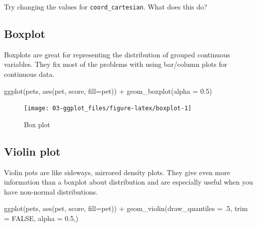 \documentclass[
  oneside]{book}
\newenvironment{Shaded}{\begin{snugshade}}{\end{snugshade}}
\newcommand{\AttributeTok}[1]{\textcolor[rgb]{0.77,0.63,0.00}{#1}}
\newcommand{\ConstantTok}[1]{\textcolor[rgb]{0.00,0.00,0.00}{#1}}
\newcommand{\DecValTok}[1]{\textcolor[rgb]{0.00,0.00,0.81}{#1}}
\newcommand{\FloatTok}[1]{\textcolor[rgb]{0.00,0.00,0.81}{#1}}
\newcommand{\FunctionTok}[1]{\textcolor[rgb]{0.00,0.00,0.00}{#1}}
\newcommand{\NormalTok}[1]{#1}
\newcommand{\SpecialCharTok}[1]{\textcolor[rgb]{0.00,0.00,0.00}{#1}}
\begin{document}
\begin{try}
Try changing the values for \texttt{coord\_cartesian}. What does this do?

\end{try}

\hypertarget{geom_boxplot}{%
\subsection{Boxplot}\label{geom_boxplot}}

Boxplots are great for representing the distribution of grouped continuous variables. They fix most of the problems with using bar/column plots for continuous data.

\begin{Shaded}
\begin{Highlighting}[]
\FunctionTok{ggplot}\NormalTok{(pets, }\FunctionTok{aes}\NormalTok{(pet, score, }\AttributeTok{fill=}\NormalTok{pet)) }\SpecialCharTok{+}
  \FunctionTok{geom\_boxplot}\NormalTok{(}\AttributeTok{alpha =} \FloatTok{0.5}\NormalTok{)}
\end{Highlighting}
\end{Shaded}

\begin{figure}

{\centering \texttt{[image: 03-ggplot\_files/figure-latex/boxplot-1]} 

}

\caption{Box plot}\label{fig:boxplot}
\end{figure}

\hypertarget{geom_violin}{%
\subsection{Violin plot}\label{geom_violin}}

Violin pots are like sideways, mirrored density plots. They give even more information than a boxplot about distribution and are especially useful when you have non-normal distributions.

\begin{Shaded}
\begin{Highlighting}[]
\FunctionTok{ggplot}\NormalTok{(pets, }\FunctionTok{aes}\NormalTok{(pet, score, }\AttributeTok{fill=}\NormalTok{pet)) }\SpecialCharTok{+}
  \FunctionTok{geom\_violin}\NormalTok{(}\AttributeTok{draw\_quantiles =}\NormalTok{ .}\DecValTok{5}\NormalTok{,}
              \AttributeTok{trim =} \ConstantTok{FALSE}\NormalTok{, }\AttributeTok{alpha =} \FloatTok{0.5}\NormalTok{,)}
\end{Highlighting}
\end{Shaded}
\end{document}
